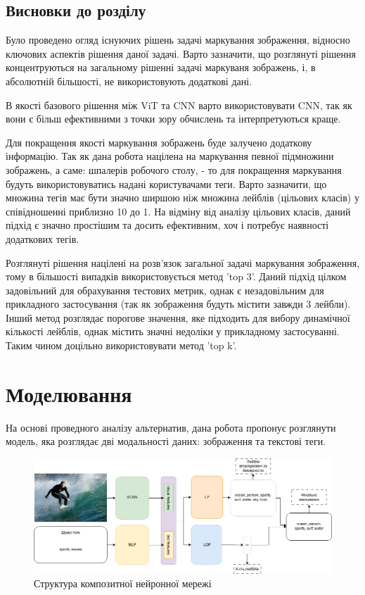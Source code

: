\documentclass{udstu}
\begin{document}
\section{Висновки до розділу}

Було проведено огляд існуючих рішень задачі маркування зображення, відносно ключових аспектів рішення даної
задачі. Варто зазначити, що розглянуті рішення концентруються на загальному рішенні задачі маркуваня зображень,
і, в абсолютній більшості, не використовують додаткові дані.

В якості базового рішення між ViT та CNN варто використовувати CNN, так як вони є більш ефективними
з точки зору обчислень та інтерпретуються краще.

Для покращення якості маркування зображень буде залучено додаткову інформацію.
Так як дана робота націлена на маркування певної підмножини зображень, а саме: шпалерів робочого столу, - то
для покращення маркування будуть використовуватись надані користувачами теги. Варто зазначити, що
множина тегів має бути значно ширшою ніж множина лейблів (цільових класів) у співідношенні приблизно 10 до 1.
На відміну від аналізу цільових класів, даний підхід є значно простішим та досить ефективним,
хоч і потребує наявності додаткових тегів.

Розглянуті рішення націлені на розв'язок загальної задачі маркування зображення, тому в більшості випадків
використовується метод 'top 3'. Даний підхід цілком задовільний для обрахування тестових метрик, однак
є незадовільним для прикладного застосування (так як зображення будуть містити завжди 3 лейбли).
Інший метод розглядає порогове значення, яке підходить для вибору динамічної кількості лейблів, однак
містить значні недоліки у прикладному застосуванні. Таким чином доцільно використовувати метод 'top k'.


\chapter{Моделювання}

На основі проведного аналізу альтернатив, дана робота пропонує розглянути
модель, яка розглядає дві модальності даних: зображення та текстові теги.

\begin{figure}[!ht]
	\centering
	\includegraphics[width=1.0\textwidth]{PNG/composite}
	\caption{Структура композитної нейронної мережі}
	\label{figure:composite}
\end{figure}
\end{document}
